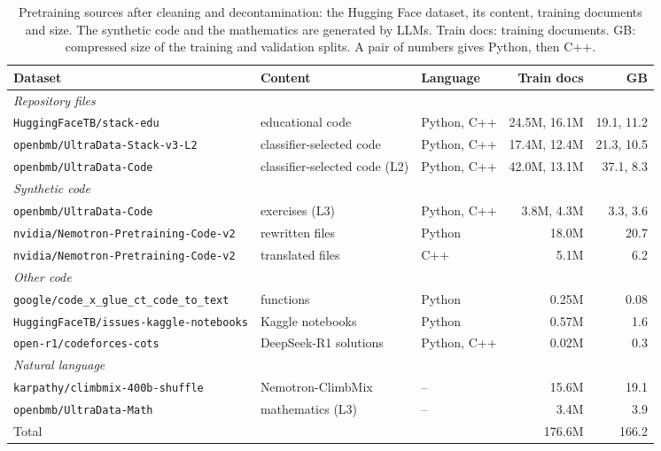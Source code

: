 \documentclass[sigconf,nonacm,balance=false]{acmart}
\begin{document}
\begin{table}
  \caption{Pretraining sources after cleaning and decontamination: the Hugging Face dataset, its content, training
  documents and size. The synthetic code and the mathematics are generated by LLMs. Train docs: training documents.
  GB: compressed size of the training and validation splits. A pair of numbers gives Python, then C++.}
  \label{tab:sources}
  \small
  \begin{tabular}{lllrr}
    \toprule
    Dataset & Content & Language & Train docs & GB \\
    \midrule
    \multicolumn{5}{l}{\emph{Repository files}} \\
    \texttt{HuggingFaceTB/stack-edu} & educational code & Python, C++ & 24.5M, 16.1M & 19.1, 11.2 \\
    \texttt{openbmb/UltraData-Stack-v3-L2} & classifier-selected code & Python, C++ & 17.4M, 12.4M & 21.3, 10.5 \\
    \texttt{openbmb/UltraData-Code} & classifier-selected code (L2) & Python, C++ & 42.0M, 13.1M & 37.1, 8.3 \\
    \midrule
    \multicolumn{5}{l}{\emph{Synthetic code}} \\
    \texttt{openbmb/UltraData-Code} & exercises (L3) & Python, C++ & 3.8M, 4.3M & 3.3, 3.6 \\
    \texttt{nvidia/Nemotron-Pretraining-Code-v2} & rewritten files & Python & 18.0M & 20.7 \\
    \texttt{nvidia/Nemotron-Pretraining-Code-v2} & translated files & C++ & 5.1M & 6.2 \\
    \midrule
    \multicolumn{5}{l}{\emph{Other code}} \\
    \texttt{google/code\_x\_glue\_ct\_code\_to\_text} & functions & Python & 0.25M & 0.08 \\
    \texttt{HuggingFaceTB/issues-kaggle-notebooks} & Kaggle notebooks & Python & 0.57M & 1.6 \\
    \texttt{open-r1/codeforces-cots} & DeepSeek-R1 solutions & Python, C++ & 0.02M & 0.3 \\
    \midrule
    \multicolumn{5}{l}{\emph{Natural language}} \\
    \texttt{karpathy/climbmix-400b-shuffle} & Nemotron-ClimbMix & -- & 15.6M & 19.1 \\
    \texttt{openbmb/UltraData-Math} & mathematics (L3) & -- & 3.4M & 3.9 \\
    \midrule
    Total & & & 176.6M & 166.2 \\
    \bottomrule
  \end{tabular}
\end{table}
\end{document}
